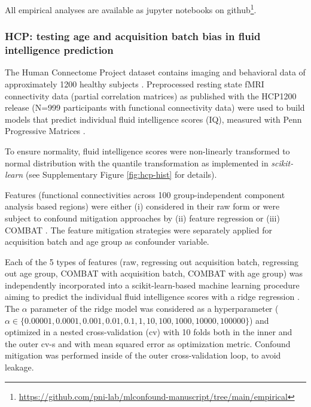 \documentclass{article}
\begin{document}
All empirical analyses are available as jupyter notebooks on github\footnote{\href{https://github.com/pni-lab/mlconfound-manuscript/tree/main/empirical}{https://github.com/pni-lab/mlconfound-manuscript/tree/main/empirical}}.

\subsubsection*{HCP: testing age and acquisition batch bias in fluid intelligence prediction}

The Human Connectome Project dataset contains imaging and behavioral data of approximately 1200 healthy subjects \citep{van2013wu}. Preprocessed resting state fMRI connectivity data (partial correlation matrices) \citep{glasser2013minimal} as published with the HCP1200 release (N=999 participants with functional connectivity data) were used to build models that predict individual fluid intelligence scores (IQ), measured with Penn Progressive Matrices \citep{duncan2000neural}.

To ensure normality, fluid intelligence scores were non-linearly transformed to normal distribution with the quantile transformation \citep{beasley2009rank} as implemented in \emph{scikit-learn} \citep{pedregosa2011scikit} (see Supplementary Figure \ref{fig:hcp-hist} for details).

Features (functional connectivities across 100 group-independent component analysis based regions) were either (i) considered in their raw form or were subject to confound mitigation approaches by (ii) feature regression \citep{rao2017predictive} or (iii) COMBAT \citep{johnson2007adjusting, fortin2018harmonization}.
The feature mitigation strategies were separately applied for acquisition batch and age group as confounder variable.

Each of the 5 types of features (raw, regressing out acquisition batch, regressing out age group, COMBAT with acquisition batch, COMBAT with age group) was independently incorporated into a scikit-learn-based \citep{pedregosa2011scikit} machine learning procedure aiming to predict the individual fluid intelligence scores with a ridge regression \citep{hoerl1970ridge}. The $\alpha$ parameter of the ridge model was considered as a hyperparameter ($\alpha \in \{0.00001, 0.0001, 0.001, 0.01, 0.1, 1, 10, 100, 1000, 10000, 100000\}$) and optimized in a nested cross-validation (cv) with 10 folds both in the inner and the outer cv-s and with mean squared error as optimization metric. Confound mitigation was performed inside of the outer cross-validation loop, to avoid leakage.
\end{document}
